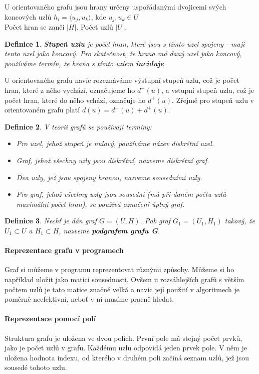 \documentclass[10pt,a4paper]{article}
\newtheorem{definition}{Definice}
\begin{document}
U orientovaného grafu jsou hrany určeny uspořádanými dvojicemi svých koncových uzlů $h_i = \langle u_j, u_k \rangle$, kde $u_j, u_k \in U$ \\
Počet hran se zančí $|H|$. Počet uzlů $|U|$.
\begin{definition}
\textbf{Stupeň uzlu} je počet hran, které jsou s tímto uzel spojeny - mají tento uzel jako koncový. Pro skutečnost, že hrana má daný uzel jako koncový, používáme termín, že hrana s tímto uzlem \textbf{inciduje}.
\end{definition}
U orientovaného grafu navíc rozeznáváme výstupní stupeň uzlu, což je počet hran, které z něho vychází, označujeme ho $d^-(u)$, a vstupní stupeň uzlu, což je počet hran, které do něho vchází, označuje ho $d^+(u)$. Zřejmě pro stupeň uzlu v orientovaném grafu platí $d(u) = d^-(u) + d^+(u) $.
\begin{definition}
V teorii grafů se používají termíny:
\begin{itemize}
	\item Pro uzel, jehož stupeň je nulový, používáme název diskrétní uzel.
	\item Graf, jehož všechny uzly jsou diskrétní, nazveme diskrétní graf.
	\item Dva uzly, jež jsou spojeny hranou, nazveme sousedními uzly.
	\item Pro graf, jehož všechny uzly jsou sousední (má při daném počtu uzlů maximální počet hran), se používá označení úplný graf.
\end{itemize}
\end{definition}
\begin{definition}
Nechť je dán graf $G = (U, H)$. Pak graf $G_1 = (U_1 , H_1 )$ takový, že $U_1 \subset U$ a $H_1 \subset H$, nazveme \textbf{podgrafem grafu G}.
\end{definition}
\paragraph{Reprezentace grafu v programech}
Graf si můžeme v programu reprezentovat různými způsoby. Můžeme si ho například uložit jako matici sousednosti. Ovšem u rozsáhlejších grafů s větším počtem uzlů je tato matice značně velká a navíc její použití v algoritmech je poměrně neefektivní, neboť v ní musíme pracně hledat.
\paragraph{Reprezentace pomocí polí}
Struktura grafu je uložena ve dvou polích. První pole má stejný počet prvků, jako je počet uzlů v grafu. Každému uzlu odpovídá jeden prvek pole. V něm je uložena hodnota indexu, od kterého v druhém poli začíná seznam uzlů, jež jsou sousedé tohoto uzlu.
\end{document}
